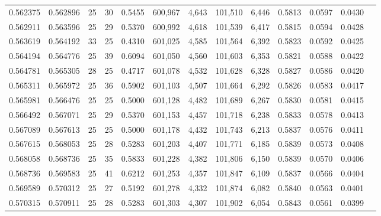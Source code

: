 \begin{tabular}{rrrrrrrrrrrrr}
0.562375 & 0.562896 &    25 &  30 &                                     0.5455 & 600,967 &   4,643 & 101,510 &   6,446 & 0.5813 & 0.0597 & 0.0430 \\
0.562911 & 0.563596 &    25 &  29 &                                     0.5370 & 600,992 &   4,618 & 101,539 &   6,417 & 0.5815 & 0.0594 & 0.0428 \\
0.563619 & 0.564192 &    33 &  25 &                                     0.4310 & 601,025 &   4,585 & 101,564 &   6,392 & 0.5823 & 0.0592 & 0.0425 \\
0.564194 & 0.564776 &    25 &  39 &                                     0.6094 & 601,050 &   4,560 & 101,603 &   6,353 & 0.5821 & 0.0588 & 0.0422 \\
0.564781 & 0.565305 &    28 &  25 &                                     0.4717 & 601,078 &   4,532 & 101,628 &   6,328 & 0.5827 & 0.0586 & 0.0420 \\
0.565311 & 0.565972 &    25 &  36 &                                     0.5902 & 601,103 &   4,507 & 101,664 &   6,292 & 0.5826 & 0.0583 & 0.0417 \\
0.565981 & 0.566476 &    25 &  25 &                                     0.5000 & 601,128 &   4,482 & 101,689 &   6,267 & 0.5830 & 0.0581 & 0.0415 \\
0.566492 & 0.567071 &    25 &  29 &                                     0.5370 & 601,153 &   4,457 & 101,718 &   6,238 & 0.5833 & 0.0578 & 0.0413 \\
0.567089 & 0.567613 &    25 &  25 &                                     0.5000 & 601,178 &   4,432 & 101,743 &   6,213 & 0.5837 & 0.0576 & 0.0411 \\
0.567615 & 0.568053 &    25 &  28 &                                     0.5283 & 601,203 &   4,407 & 101,771 &   6,185 & 0.5839 & 0.0573 & 0.0408 \\
0.568058 & 0.568736 &    25 &  35 &                                     0.5833 & 601,228 &   4,382 & 101,806 &   6,150 & 0.5839 & 0.0570 & 0.0406 \\
0.568736 & 0.569583 &    25 &  41 &                                     0.6212 & 601,253 &   4,357 & 101,847 &   6,109 & 0.5837 & 0.0566 & 0.0404 \\
0.569589 & 0.570312 &    25 &  27 &                                     0.5192 & 601,278 &   4,332 & 101,874 &   6,082 & 0.5840 & 0.0563 & 0.0401 \\
0.570315 & 0.570911 &    25 &  28 &                                     0.5283 & 601,303 &   4,307 & 101,902 &   6,054 & 0.5843 & 0.0561 & 0.0399 \\

\end{tabular}
